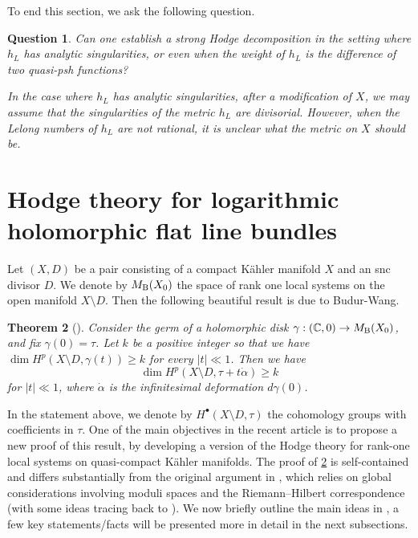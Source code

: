 \documentclass[english]{amsart}
\newcommand{\CC}{\mathbb{C}}
\renewcommand{\geq}{\geqslant}
\newtheorem{thm}{Theorem}[section]
\newtheorem{quest}[thm]{Question}
\numberwithin{equation}{thm}
\begin{document}
To end this section, we ask the following question.

\begin{quest}
	Can one establish a strong Hodge decomposition in the setting where $h_L$ has analytic singularities, or even when the weight of $h_L$ is the difference of two quasi-psh functions?
	\medskip
	
In the case where $h_L$ has analytic singularities, after a modification of $X$, we may assume that the singularities of the metric $h_L$ are divisorial. However, when the Lelong numbers of $h_L$ are not rational, it is unclear what the metric on $X$ should be.
\end{quest}




\section{Hodge theory for logarithmic holomorphic flat line bundles}\label{logflat}



Let $(X, D)$ be a pair consisting of a compact K\"ahler manifold $X$ and an snc divisor $D$. We denote by $M_{\rm B}(X_0)$ the space of rank one local systems on the open manifold $X\setminus D$.
Then the following beautiful result is due to Budur-Wang.
\begin{thm}[\cite{BW20}]\label{introcomp}
	Consider the germ of a holomorphic disk $\gamma: (\CC, 0)\to M_{\rm B} (X_0)$, and fix $\gamma(0)= \tau$. Let $k$ be a positive integer so that we have $\displaystyle \dim  H^p (X\setminus D, \gamma ( t)) \geq k$ for every $|t| \ll 1$.  Then we have
	\begin{equation} 
		\dim H^p (X\setminus D, \tau + t\dot\alpha )\geq k
	\end{equation}
	for $ |t|\ll 1$, where $\dot\alpha$ is the infinitesimal deformation  $d\gamma(0)$. 
\end{thm}

\noindent In the statement above, we denote by \(H^\bullet(X\setminus D, \tau)\) the cohomology groups with coefficients in \(\tau\).  
One of the main objectives in the recent article \cite{CDHP} is to propose a new proof of this result,  
by developing a version of the Hodge theory for rank-one local systems on quasi-compact K\"ahler manifolds. 
The proof of \ref{introcomp} is self-contained and differs substantially from the original argument in \cite{BW20}, which relies on global considerations involving moduli spaces and the Riemann–Hilbert correspondence (with some ideas tracing back to \cite{Sim93}).  
We now briefly outline the main ideas in \cite{CDHP}, a few key statements/facts will be presented more in detail in the next subsections.
\end{document}
